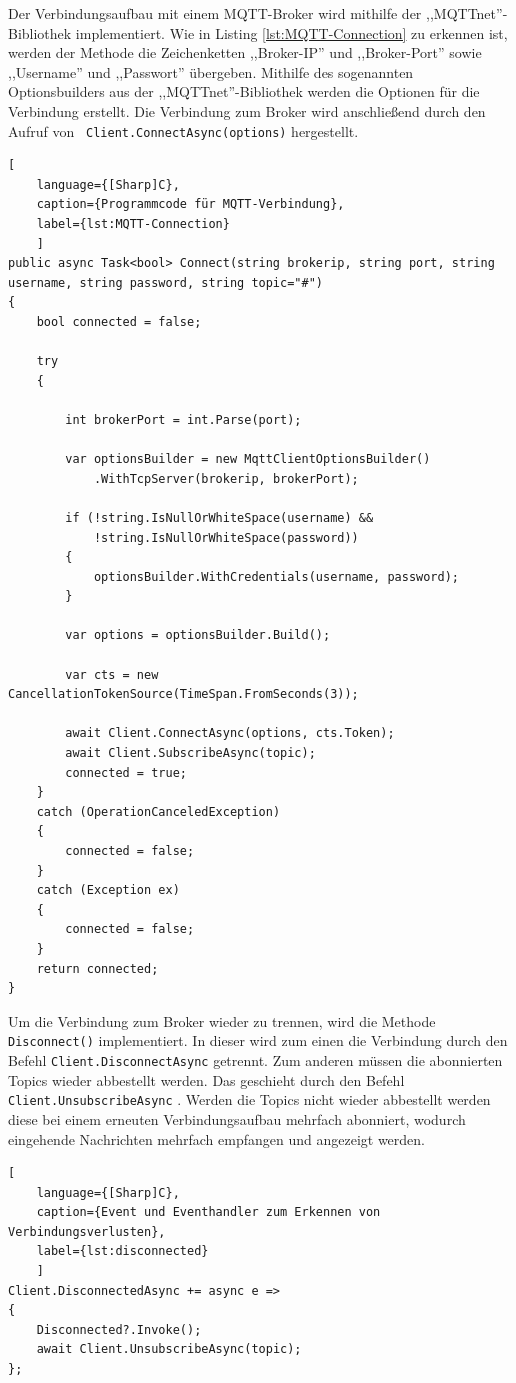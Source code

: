 Der Verbindungsaufbau mit einem MQTT-Broker wird mithilfe der ,,MQTTnet''-Bibliothek implementiert. Wie in Listing \ref{lst:MQTT-Connection} zu erkennen ist, werden der Methode die Zeichenketten ,,Broker-IP'' und ,,Broker-Port'' sowie ,,Username'' und ,,Passwort'' übergeben. 
Mithilfe des sogenannten Optionsbuilders aus der ,,MQTTnet''-Bibliothek werden die Optionen für die Verbindung erstellt. Die Verbindung zum Broker wird anschließend durch den Aufruf von \lstinline| Client.ConnectAsync(options)| hergestellt. 
\begin{lstlisting}[
    language={[Sharp]C},
    caption={Programmcode für MQTT-Verbindung},
    label={lst:MQTT-Connection}
    ]
public async Task<bool> Connect(string brokerip, string port, string username, string password, string topic="#")
{
    bool connected = false;

    try
    {

        int brokerPort = int.Parse(port);

        var optionsBuilder = new MqttClientOptionsBuilder()
            .WithTcpServer(brokerip, brokerPort);

        if (!string.IsNullOrWhiteSpace(username) &&
            !string.IsNullOrWhiteSpace(password))
        {
            optionsBuilder.WithCredentials(username, password);
        }

        var options = optionsBuilder.Build();

        var cts = new CancellationTokenSource(TimeSpan.FromSeconds(3));

        await Client.ConnectAsync(options, cts.Token);
        await Client.SubscribeAsync(topic);
        connected = true;
    }
    catch (OperationCanceledException)
    {
        connected = false;
    }
    catch (Exception ex)
    {
        connected = false;
    }
    return connected;
}
\end{lstlisting}

Um die Verbindung zum Broker wieder zu trennen, wird die Methode \lstinline|Disconnect()| implementiert. In dieser wird zum einen die Verbindung durch  den Befehl \lstinline|Client.DisconnectAsync| getrennt. Zum anderen müssen die abonnierten Topics wieder abbestellt werden. 
Das geschieht durch den Befehl \lstinline|Client.UnsubscribeAsync| . Werden die Topics nicht wieder abbestellt werden diese bei einem erneuten Verbindungsaufbau mehrfach abonniert, wodurch eingehende Nachrichten mehrfach empfangen und angezeigt werden.
\begin{lstlisting}[
    language={[Sharp]C},
    caption={Event und Eventhandler zum Erkennen von Verbindungsverlusten},
    label={lst:disconnected}
    ]
Client.DisconnectedAsync += async e =>
{
    Disconnected?.Invoke();
    await Client.UnsubscribeAsync(topic);
};
\end{lstlisting}


